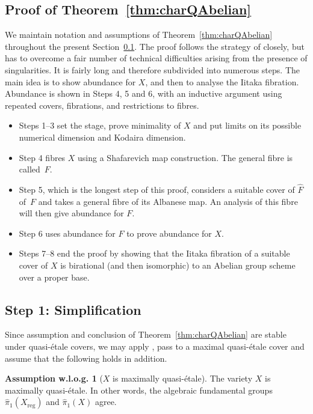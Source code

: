 \documentclass[JEP,XML,SOM,Unicode,published]{cedram}
\theoremstyle{plain}
\theoremstyle{definition}
\newtheorem{asswlog}[thm]{Assumption w.l.o.g.}
\numberwithin{equation}{thm}
\numberwithin{enumi}{thm}
\newcommand{\reg}{\mathrm{reg}}
\let\what\widehat
\begin{document}
\subsection{Proof of Theorem~\ref*{thm:charQAbelian}}
\label{ssec:pf44}

We maintain notation and assumptions of Theorem~\ref{thm:charQAbelian}
throughout the present Section~\ref{ssec:pf44}. The proof follows the strategy
of \cite{MR3030068} closely, but has to overcome a fair number of technical
difficulties arising from the presence of singularities. It is fairly long and
therefore subdivided into numerous steps. The main idea is to show abundance
for $X$, and then to analyse the Iitaka fibration. Abundance is shown in Steps
4, 5 and 6, with an inductive argument using repeated covers, fibrations, and
restrictions to fibres.

\begin{itemize}
\item Steps 1--3 set the stage, prove minimality of $X$ and put limits on its
possible numerical dimension and Kodaira dimension.

\item Step 4 fibres $X$ using a Shafarevich map construction. The general fibre
is called~$F$.

\item Step 5, which is the longest step of this proof, considers a suitable
cover of $\what{F}$ of~$F$ and takes a general fibre of its Albanese map. An
analysis of this fibre will then give abundance for $F$.

\item Step 6 uses abundance for $F$ to prove abundance for $X$.

\item Steps 7--8 end the proof by showing that the Iitaka fibration of a
suitable cover of $X$ is birational (and then isomorphic) to an Abelian group
scheme over a proper base.
\end{itemize}

\subsection*{Step 1: Simplification}

Since assumption and conclusion of Theorem~\ref{thm:charQAbelian} are stable
under quasi-étale covers, we may apply \cite[Th.\,1.5]{GKP13}, pass to a maximal
quasi-étale cover and assume that the following holds in addition.

\begin{asswlog}[$X$ is maximally quasi-étale]\label{asswlog:mqe}
The variety $X$ is maximally quasi-étale. In other words, the algebraic
fundamental groups $\what{\pi}_1(X_{\reg})$ and $\what{\pi}_1(X)$ agree.
\end{asswlog}
\end{document}
